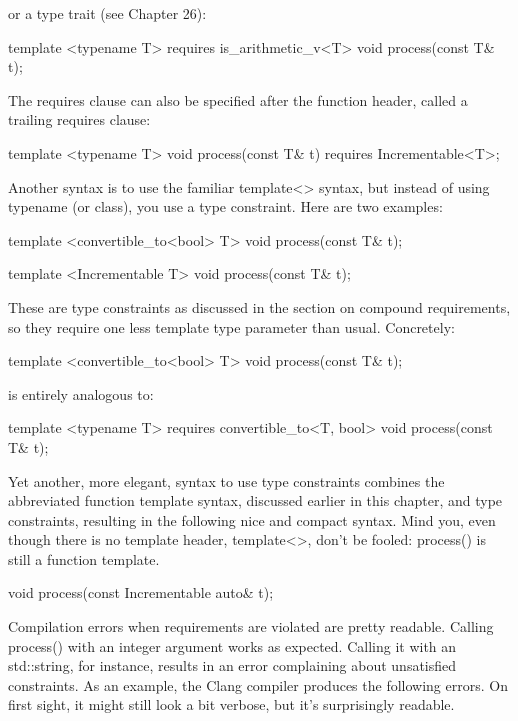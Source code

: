 or a type trait (see Chapter 26):

\begin{cpp}
template <typename T> requires is_arithmetic_v<T>
void process(const T& t);
\end{cpp}

The requires clause can also be specified after the function header, called a trailing requires clause:

\begin{cpp}
template <typename T>
void process(const T& t) requires Incrementable<T>;
\end{cpp}

Another syntax is to use the familiar template<> syntax, but instead of using typename (or class), you use a type constraint. Here are two examples:

\begin{cpp}
template <convertible_to<bool> T>
void process(const T& t);

template <Incrementable T>
void process(const T& t);
\end{cpp}

These are type constraints as discussed in the section on compound requirements, so they require one less template type parameter than usual. Concretely:

\begin{cpp}
template <convertible_to<bool> T>
void process(const T& t);
\end{cpp}

is entirely analogous to:

\begin{cpp}
template <typename T> requires convertible_to<T, bool>
void process(const T& t);
\end{cpp}

Yet another, more elegant, syntax to use type constraints combines the abbreviated function template syntax, discussed earlier in this chapter, and type constraints, resulting in the following nice and compact syntax. Mind you, even though there is no template header, template<>, don’t be fooled: process() is still a function template.

\begin{cpp}
void process(const Incrementable auto& t);
\end{cpp}

Compilation errors when requirements are violated are pretty readable. Calling process() with an integer argument works as expected. Calling it with an std::string, for instance, results in an error complaining about unsatisfied constraints. As an example, the Clang compiler produces the following errors. On first sight, it might still look a bit verbose, but it’s surprisingly readable.

